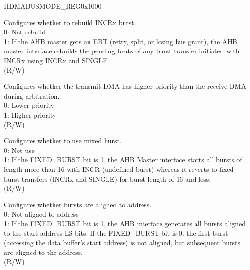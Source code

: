 

\begin{register}{H}{DMABUSMODE\_REG}{0x1000}\label{regdesc:DMABUSMODEREG}
%
%
%
%
%
%
%
%
%
%
%
%
%
%
%
\regnewline%
\begin{regdesc}\begin{reglist}
\item [DMAREBUILDINCRBURST] Configures whether to rebuild INCRx burst.\\
0: Not rebuild\\
1: If the AHB master gets an EBT (retry, split, or losing bus grant), the AHB master interface rebuilds the pending beats of any burst transfer initiated with INCRx using INCRx and SINGLE.\\(R/W)
\item [DMATRANSMITPRIORITY] Configures whether the transmit DMA has higher priority than the receive DMA during arbitration.\\
0: Lower priority\\
1: Higher priority\\ (R/W)
\item [DMAMIXEDBURST] Configures whether to use mixed burst.\\
0: Not use\\
1: If the FIXED\_BURST bit is 1, the AHB Master interface starts all bursts of length more than 16 with INCR (undefined burst) whereas it reverts to fixed burst transfers (INCRx and SINGLE) for burst length of 16 and less.\\(R/W)
\item [DMAADDRALIBEA] Configures whether bursts are aligned to address.\\
0: Not aligned to address\\
1: If the FIXED\_BURST bit is 1, the AHB interface generates all bursts aligned to the start address LS bits. If the FIXED\_BURST bit is 0, the first burst (accessing the data buffer's start address) is not aligned, but subsequent bursts are aligned to the address.\\(R/W)

\item [Continued on the next page...]
\end{reglist}\end{regdesc}
\end{register}

